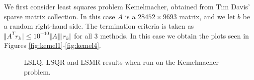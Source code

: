 \documentclass[11pt]{article}
\begin{document}
We first consider least squares problem Kemelmacher, obtained from Tim Davis' sparse matrix collection. In this case $A$ is a $28452 \times 9693$ matrix, and we let $b$ be a random right-hand side. The termination criteria is taken as $\Vert A^T r_k \Vert \leq 10^{-10} \Vert A \Vert \Vert r_k \Vert$ for all 3 methods. In this case we obtain the plots seen in Figures \ref{fig:kemel1}-\ref{fig:kemel4}.

\begin{figure}[ht]
\centering
	\hfill
	
	\hfill
	
	\caption{LSLQ, LSQR and LSMR results when run on the Kemelmacher problem.}
\end{figure}
\end{document}

